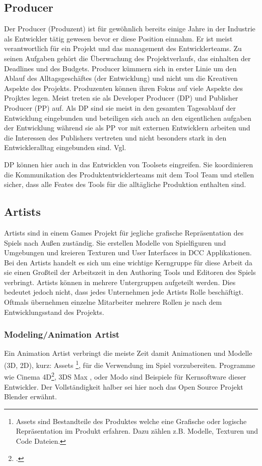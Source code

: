 \documentclass[pagesize, paper=a4, fontsize=12pt, titlepage=true, headings=small, headnosepline, abstractoff, liststotoc, nochapterprefix, plainheadsepline, twoside]{scrreprt}
\begin{document}
\subsection{Producer}
Der Producer (Produzent) ist für gewöhnlich bereits einige Jahre in der Industrie als Entwickler tätig gewesen bevor er diese Position einnahm. Er ist meist verantwortlich für ein Projekt und das management des Entwicklerteams. Zu seinen Aufgaben gehört die Überwachung des Projektverlaufs, das einhalten der Deadlines und des Budgets. Producer kümmern sich in erster Linie um den Ablauf des Alltagsgeschäftes (der Entwicklung) und nicht um die Kreativen Aspekte des Projekts. Produzenten können ihren Fokus auf viele Aspekte des Projktes legen. Meist treten sie als Developer Producer (DP) und Publisher Producer (PP) auf. Als DP sind sie meist in den gesamten Tagesablauf der Entwicklung eingebunden und beteiligen sich auch an den eigentlichen aufgaben der Entwicklung während sie als PP vor mit externen Entwicklern arbeiten und die Interessen des Publishers vertreten und nicht besonders stark in den Entwickleralltag eingebunden sind. Vgl. 

DP können hier auch in das Entwicklen von Toolsets eingreifen. Sie koordinieren die Kommunikation des Produktentwicklerteams mit dem Tool Team und stellen sicher, dass alle Feates des Tools für die alltägliche Produktion enthalten sind.

\subsection{Artists}
Artists sind in einem Games Projekt für jegliche grafische Repräsentation des Spiels nach Außen zuständig. Sie erstellen Modelle von Spielfiguren und Umgebungen und kreieren Texturen und User Interfaces in DCC Applikationen. Bei den Artists handelt es sich um eine wichtige Kerngruppe für diese Arbeit da sie einen Großteil der Arbeitszeit in den Authoring Tools und Editoren des Spiels verbringt. Artists können in mehrere Untergruppen aufgeteilt werden. Dies bedeutet jedoch nicht, dass jedes Unternehmen jede Artists Rolle beschäftigt. Oftmals übernehmen einzelne Mitarbeiter mehrere Rollen je nach dem Entwicklungsstand des Projekts.

\subsubsection{Modeling/Animation Artist}
Ein Animation Artist verbringt die meiste Zeit damit Animationen und Modelle (3D, 2D), kurz: Assets \footnote{Assets sind Bestandteile des Produktes welche eine Grafische oder logische Repräsentation im Produkt erfahren. Dazu zählen z.B. Modelle, Texturen und Code Dateien.}, für die Verwendung im Spiel vorzubereiten. Programme wie Cinema 4D\footcite{MaxonC4d2014}, 3DS Max \parencite{AutodeskMax2014}, oder Modo\parencite{FoundryModo2014} sind Beispiele für Kernsoftware dieser Entwickler. Der Vollständigkeit halber sei hier noch das Open Source Projekt Blender \parencite{Blender2015} erwähnt.
\end{document}
